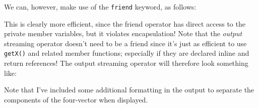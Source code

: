 \documentclass[a4paper]{scrartcl}
\begin{document}
We can, however, make use of the \verb|friend| keyword, as follows:



This is clearly more efficient, since the friend operator has direct access to the private member variables, but it violates encapsulation! Note that the \emph{output} streaming operator doesn't need to be a friend since it's just as efficient to use \verb|getX()| and related member functions; especially if they are declared inline and return references! The output streaming operator will therefore look something like:



Note that I've included some additional formatting in the output to separate the components of the four-vector when displayed.


\end{document}
